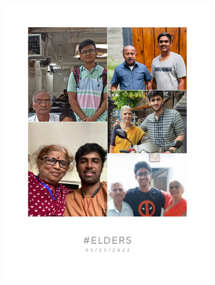 \documentclass[11pt]{article}
\begin{document}
\begin{figure}[H]
	\centering
	\includegraphics[scale=0.25]{WhatsApp Image 2022-05-25 at 00.32.11 (1).jpeg}
	\label{it}
\end{figure}
\end{document}
